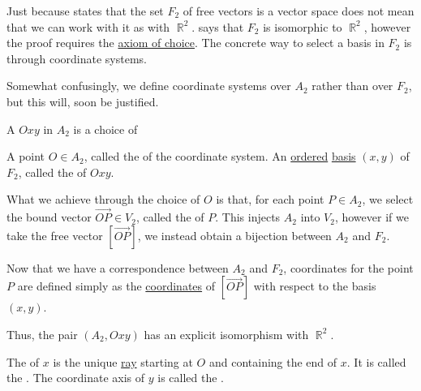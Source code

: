 \begin{definition}\label{def:euclidean_plane_coordinate_system}
  Just because  states that the set \( F_2 \) of free vectors is a vector space does not mean that we can work with it as with \( \BbbR^2 \).  says that \( F_2 \) is isomorphic to \( \BbbR^2 \), however the proof requires the \hyperref[def:zfc/choice]{axiom of choice}. The concrete way to select a basis in \( F_2 \) is through coordinate systems.

  Somewhat confusingly, we define coordinate systems over \( A_2 \) rather than over \( F_2 \), but this will, soon be justified.

  A  \( Oxy \) in \( A_2 \) is a choice of
  \begin{thmenum}
     A point \( O \in A_2 \), called the  of the coordinate system.
     An \hyperref[def:partially_ordered_set]{ordered} \hyperref[def:left_module_hamel_basis]{basis} \( (x, y) \) of \( F_2 \), called the  of \( Oxy \).
  \end{thmenum}

  What we achieve through the choice of \( O \) is that, for each point \( P \in A_2 \), we select the bound vector \( \overrightarrow{OP} \in V_2 \), called the  of \( P \). This injects \( A_2 \) into \( V_2 \), however if we take the free vector \( [\overrightarrow{OP}] \), we instead obtain a bijection between \( A_2 \) and \( F_2 \).

  Now that we have a correspondence between \( A_2 \) and \( F_2 \), coordinates for the point \( P \) are defined simply as the \hyperref[def:left_module_basis_projection]{coordinates} of \( [\overrightarrow{OP}] \) with respect to the basis \( (x, y) \).

  Thus, the pair \( (A_2, Oxy) \) has an explicit isomorphism with \( \BbbR^2 \).

  The  of \( x \) is the unique \hyperref[def:affine_plane/ray]{ray} starting at \( O \) and containing the end of \( x \). It is called the . The coordinate axis of \( y \) is called the .
\end{definition}

